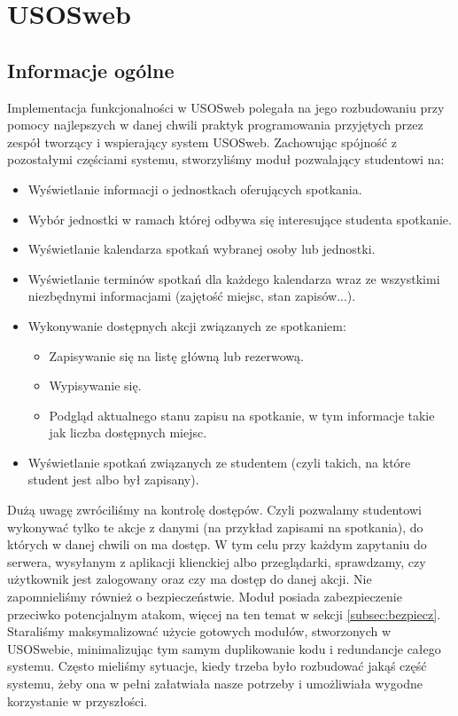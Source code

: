\documentclass[licencjacka]{pracamgr}
\begin{document}
\section{USOSweb} \label{sec:impusosweb}

\subsection{Informacje ogólne}
Implementacja funkcjonalności w USOSweb polegała na jego rozbudowaniu przy pomocy najlepszych w danej chwili praktyk programowania przyjętych przez zespół tworzący i wspierający system USOSweb. Zachowując spójność z pozostałymi częściami systemu, stworzyliśmy moduł pozwalający studentowi na:
\begin{itemize}
  \item{Wyświetlanie informacji o jednostkach oferujących spotkania.}
  \item{Wybór jednostki w ramach której odbywa się interesujące studenta spotkanie.}
  \item{Wyświetlanie kalendarza spotkań wybranej osoby lub jednostki.}
  \item{Wyświetlanie terminów spotkań dla każdego kalendarza wraz ze wszystkimi niezbędnymi informacjami (zajętość miejsc, stan zapisów...).}
  \item{Wykonywanie dostępnych akcji związanych ze spotkaniem:
  \begin{itemize}
    \item{Zapisywanie się na listę główną lub rezerwową.}
    \item{Wypisywanie się.}
    \item{Podgląd aktualnego stanu zapisu na spotkanie, w tym informacje takie jak liczba dostępnych miejsc.}
  \end{itemize}
}
\item{Wyświetlanie spotkań związanych ze studentem (czyli takich, na które student jest albo był zapisany).}
\end{itemize}

Dużą uwagę zwróciliśmy na kontrolę dostępów. Czyli pozwalamy studentowi wykonywać tylko te akcje z danymi (na przykład zapisami na spotkania), do których w danej chwili on ma dostęp. W tym celu przy każdym zapytaniu do serwera, wysyłanym z aplikacji klienckiej albo przeglądarki, sprawdzamy, czy użytkownik jest zalogowany oraz czy ma dostęp do danej akcji. Nie zapomnieliśmy również o bezpieczeństwie. Moduł posiada zabezpieczenie przeciwko potencjalnym atakom, więcej na ten temat w sekcji \ref{subsec:bezpiecz}. Staraliśmy maksymalizować użycie gotowych modułów, stworzonych w USOSwebie, minimalizując tym samym duplikowanie kodu i redundancje całego systemu. Często mieliśmy sytuacje, kiedy trzeba było rozbudować jakąś część systemu, żeby ona w pełni załatwiała nasze potrzeby i umożliwiała wygodne korzystanie w przyszłości.
\end{document}
